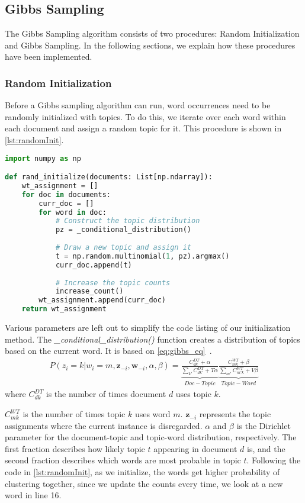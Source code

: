 \subsection{Gibbs Sampling}\label{sec:appendix_gibbs}
The Gibbs Sampling algorithm consists of two procedures: Random Initialization and Gibbs Sampling.
In the following sections, we explain how these procedures have been implemented.

\subsubsection{Random Initialization}
Before a Gibbs sampling algorithm can run, word occurrences need to be randomly initialized with topics.
To do this, we iterate over each word within each document and assign a random topic for it.
This procedure is shown in \autoref{lst:randomInit}.
\begin{lstlisting}[language=Python, caption=Random Initialization,label={lst:randomInit}, float, floatplacement=H]
import numpy as np

def rand_initialize(documents: List[np.ndarray]):
	wt_assignment = []
	for doc in documents:
		curr_doc = []
		for word in doc:
			# Construct the topic distribution
			pz = _conditional_distribution()
			
			# Draw a new topic and assign it
			t = np.random.multinomial(1, pz).argmax()
			curr_doc.append(t)
			
			# Increase the topic counts
			increase_count()
		wt_assignment.append(curr_doc)
	return wt_assignment
\end{lstlisting}

Various parameters are left out to simplify the code listing of our initialization method.
The \emph{\_conditional\_distribution()} function creates a distribution of topics based on the current word.
It is based on \autoref{eq:gibbs_eq}~\cite{author_topic_2012}.
\begin{equation}\label{eq:gibbs_eq}
	\begin{split}
		P(z_i = k|w_i = m, \boldsymbol{z}_{-i}, \boldsymbol{w}_{-i}, \alpha, \beta) = 
		\underbrace{\frac{C^{DT}_{dk} + \alpha}{\sum_{k'} C^{DT}_{dk'} + T\alpha}}_{Doc-Topic}
		\underbrace{\frac{C^{WT}_{mk} + \beta}{\sum_{m'} C^{WT}_{m'k} + V\beta}}_{Topic-Word}
	\end{split}
\end{equation}
where $C^{DT}_{dk}$ is the number of times document $d$ uses topic $k$.

$C^{WT}_{mk}$ is the number of times topic $k$ uses word $m$.
$\boldsymbol{z}_{-i}$ represents the topic assignments where the current instance is disregarded.
$\alpha$ and $\beta$ is the Dirichlet parameter for the document-topic and topic-word distribution, respectively.
The first fraction describes how likely topic $t$ appearing in document $d$ is, and the second fraction describes which words are most probable in topic $t$.
Following the code in \autoref{lst:randomInit}, as we initialize, the words get higher probability of clustering together, since we update the counts every time, we look at a new word in line 16.

